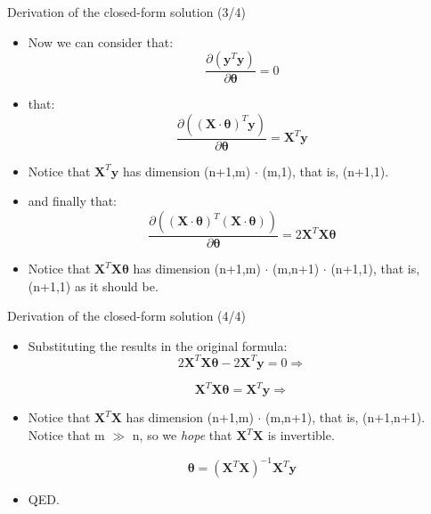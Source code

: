 \documentclass{beamer}
\begin{document}
\begin{frame}
{\centerline{Derivation of the closed-form solution  (3/4) }}

\begin{itemize}
\item Now we can consider that:
  $$ \frac{\partial (  \boldsymbol y^T \boldsymbol y )}
 { \partial \boldsymbol \theta} = 0 $$
 \item that:
  $$ \frac{\partial (
  (\boldsymbol X \cdot \boldsymbol \theta)^T \boldsymbol y
 )}
 { \partial \boldsymbol \theta} = \boldsymbol X^T \boldsymbol y$$
 \item Notice that $\boldsymbol X^T \boldsymbol y$ has dimension (n+1,m) $\cdot$ (m,1), that is, (n+1,1).

 \item and finally that:
  $$ \frac{\partial (
 (\boldsymbol X \cdot \boldsymbol \theta)^T (\boldsymbol X \cdot \boldsymbol \theta) )}
 { \partial \boldsymbol \theta} = 2  \boldsymbol X^T  \boldsymbol X \boldsymbol \theta $$
 \item Notice that $\boldsymbol X^T \boldsymbol X \boldsymbol \theta$ has dimension (n+1,m) $\cdot$ (m,n+1)  $\cdot$ (n+1,1), that is, (n+1,1) as it should be.

\end{itemize}

\end{frame}

\begin{frame}
{\centerline{Derivation of the closed-form solution (4/4) }}

\begin{itemize}
\item Substituting the results in the original formula:
  $$ 2  \boldsymbol X^T  \boldsymbol X \boldsymbol \theta - 2 \boldsymbol X^T \boldsymbol y = 0 \Rightarrow $$
  
    $$ \boldsymbol X^T  \boldsymbol X \boldsymbol \theta = \boldsymbol X^T \boldsymbol y  \Rightarrow $$
    
  \item Notice that $\boldsymbol X^T \boldsymbol X $ has dimension (n+1,m) $\cdot$ (m,n+1), that is, (n+1,n+1). Notice that m $\gg$ n, so we \textit{hope} that $\boldsymbol X^T \boldsymbol X $ is invertible.

    
        $$ \boldsymbol \theta = (\boldsymbol X^T  \boldsymbol X)^{-1}  \boldsymbol X^T \boldsymbol y  $$
        
\item QED.

\end{itemize}

\end{frame}
\end{document}
